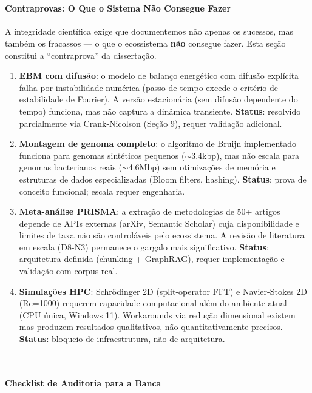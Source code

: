 \\\paragraph{Contraprovas: O Que o Sistema Não Consegue Fazer}

A integridade científica exige que documentemos não apenas os sucessos, mas
também os fracassos — o que o ecossistema \textbf{não} consegue fazer. Esta
seção constitui a ``contraprova'' da dissertação.

\begin{enumerate}[label=(\roman*)]
\item \textbf{EBM com difusão}: o modelo de balanço energético com difusão
      explícita falha por instabilidade numérica (passo de tempo excede o
      critério de estabilidade de Fourier). A versão estacionária (sem
      difusão dependente do tempo) funciona, mas não captura a dinâmica
      transiente. \textbf{Status}: resolvido parcialmente via Crank-Nicolson
      (Seção 9), requer validação adicional.
\item \textbf{Montagem de genoma completo}: o algoritmo de Bruijn implementado
      funciona para genomas sintéticos pequenos ($\sim$3.4kbp), mas não escala
      para genomas bacterianos reais ($\sim$4.6Mbp) sem otimizações de
      memória e estruturas de dados especializadas (Bloom filters, hashing).
      \textbf{Status}: prova de conceito funcional; escala requer engenharia.
\item \textbf{Meta-análise PRISMA}: a extração de metodologias de 50+ artigos
      depende de APIs externas (arXiv, Semantic Scholar) cuja disponibilidade
      e limites de taxa não são controláveis pelo ecossistema. A revisão de
      literatura em escala (D8-N3) permanece o gargalo mais significativo.
      \textbf{Status}: arquitetura definida (chunking + GraphRAG), requer
      implementação e validação com corpus real.
\item \textbf{Simulações HPC}: Schrödinger 2D (split-operator FFT) e
      Navier-Stokes 2D (Re=1000) requerem capacidade computacional além do
      ambiente atual (CPU única, Windows 11). Workarounds via redução
      dimensional existem mas produzem resultados qualitativos, não
      quantitativamente precisos. \textbf{Status}: bloqueio de infraestrutura,
      não de arquitetura.
\end{enumerate}

\\\paragraph{Checklist de Auditoria para a Banca}

